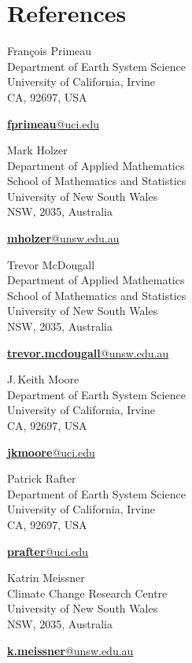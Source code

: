 \documentclass[12pt]{friggeri-cv}
\makeatletter
\newcommand{\cvRefsTwoCols}[2]{
  \begin{minipage}[t]{.45\textwidth}#1\end{minipage}
  \hfill
  \begin{minipage}[t]{.45\textwidth}#2\end{minipage}
}
\newcommand{\cvreference}[4]{
    {\headingfont\color{headercolor}#1}\\
    {#2}
    \begin{flushright}
    {\href{mailto:#3@#4}{\textbf{#3}@#4}\\}
    \end{flushright}
}
\makeatother
\begin{document}
\section{References}
\cvRefsTwoCols{
   \label{FP}
  \cvreference
    {Fran\c{c}ois Primeau}
    {Department of Earth System Science\\
     University of California, Irvine\\
     CA, 92697, USA}
    {fprimeau}
    {uci.edu}
  \phantomsection \label{MH}
  \cvreference
    {Mark Holzer}
    {Department of Applied Mathematics\\
     School of Mathematics and Statistics\\
     University of New South Wales\\
     NSW, 2035, Australia}
    {mholzer}
    {unsw.edu.au}
  \cvreference
    {Trevor McDougall}
    {Department of Applied Mathematics\\
     School of Mathematics and Statistics\\
     University of New South Wales\\
     NSW, 2035, Australia}
    {trevor.mcdougall}
    {unsw.edu.au}
}
{%
  \phantomsection \label{JKM}
  \cvreference
    {J.\,Keith Moore}
    {Department of Earth System Science\\
     University of California, Irvine\\
     CA, 92697, USA}
    {jkmoore}
    {uci.edu}
  \phantomsection \label{PR}
  \cvreference
    {Patrick Rafter}
    {Department of Earth System Science\\
     University of California, Irvine\\
     CA, 92697, USA}
    {prafter}
    {uci.edu}
  \phantomsection \label{KM}
  \cvreference
    {Katrin Meissner}
    {Climate Change Research Centre\\
     University of New South Wales\\
     NSW, 2035, Australia}
    {k.meissner}
    {unsw.edu.au}
}
\vspace{10pt}



\newpage
{}
\end{document}
